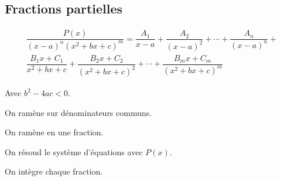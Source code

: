 \documentclass{report}
\theoremstyle{definition}
\theoremstyle{remark}
\begin{document}
	\subsection{Fractions partielles}
	\begin{multline*}
		\dfrac{P(x)}{(x-a)^n(x^2+bx+c)^m} = \dfrac{A_1}{x-a} + \dfrac{A_2}{(x-a)^2} + \dotsb + \dfrac{A_n}{(x-a)^n}+\\
		\dfrac{B_1x+C_1}{x^2+bx+c} + \dfrac{B_2x+C_2}{(x^2+bx+c)^2} + \dotsb + \dfrac{B_mx+C_m}{(x^2+bx+c)^m}
	\end{multline*}

	Avec $b^2-4ac<0$.

	On ram\`ene sur d\'enominateurs communs.

	On ram\`ene en une fraction.

	On r\'esoud le syst\`eme d'\'equations avec $P(x)$.

	On int\`egre chaque fraction.
\end{document}
